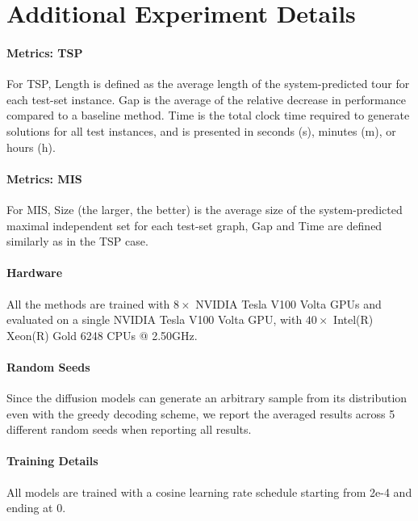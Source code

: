 \section{Additional Experiment Details} \label{app:evaluation}

\paragraph{Metrics: TSP}
For TSP, Length is defined as the average length of the system-predicted tour for each test-set instance. Gap is the average of the relative decrease in performance compared to a baseline method. 
Time is the total clock time required to generate solutions for all test instances, and is presented in seconds (s), minutes (m), or hours (h).

\paragraph{Metrics: MIS}
For MIS, Size (the larger, the better) is the average size of the system-predicted maximal independent set for each test-set graph, Gap and Time are defined similarly as in the TSP case.

\paragraph{Hardware}
All the methods are trained with $8\times$ NVIDIA Tesla V100 Volta GPUs and evaluated on a single NVIDIA Tesla V100 Volta GPU, with $40\times$ Intel(R) Xeon(R) Gold 6248 CPUs @ 2.50GHz.

\paragraph{Random Seeds}

Since the diffusion models can generate an arbitrary sample from its distribution even with the greedy decoding scheme, we report the averaged results across 5 different random seeds when reporting all results.

\paragraph{Training Details}

All \method{} models are trained with a cosine learning rate schedule starting from 2e-4 and ending at 0.


